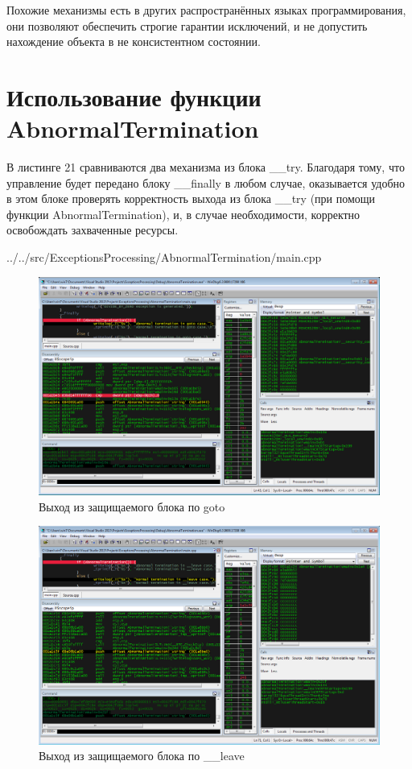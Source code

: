 \documentclass[a4paper, 12pt]{report}		%
\begin{document}
Похожие механизмы есть в других распространённых языках программирования, они позволяют обеспечить строгие гарантии исключений, и не допустить нахождение объекта в не консистентном состоянии.
\newpage

\chapter*{Использование функции AbnormalTermination}

В листинге 21 сравниваются два механизма из блока \_\_try. Благодаря тому, что управление будет передано блоку \_\_finally в любом случае, оказывается удобно в этом блоке проверять корректность выхода из блока \_\_try (при помощи функции AbnormalTermination), и, в случае необходимости, корректно освобождать захваченные ресурсы.


{../../src/ExceptionsProcessing/AbnormalTermination/main.cpp}

\begin{figure}[h!]
\centering
\includegraphics[scale=0.50]{res/014}
\caption{Выход из защищаемого блока по goto}
\end{figure}

\begin{figure}[h!]
\centering
\includegraphics[scale=0.50]{res/015}
\caption{Выход из защищаемого блока по \_\_leave}
\end{figure}
\end{document}
